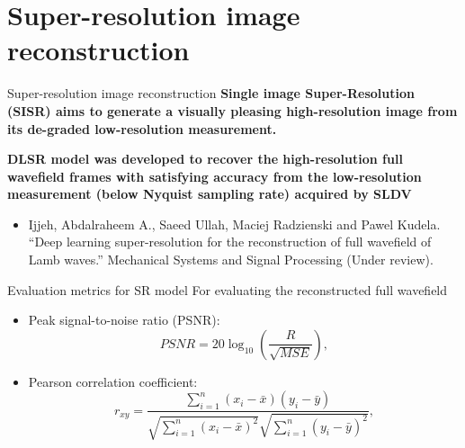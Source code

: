 \documentclass[10pt,aspectratio=169,dvipsnames]{beamer} %
\begin{document}
\section{Super-resolution image reconstruction}
\setcounter{subfigure}{0}
\begin{frame}{Super-resolution image reconstruction}
\textbf{Single image Super-Resolution (SISR) aims to generate a visually pleasing high-resolution image from its de-graded low-resolution measurement.}
\begin{figure}
	\centering
	\qquad
	\qquad
\end{figure}
\textbf{DLSR model was developed to recover the high-resolution full wavefield
	frames with satisfying accuracy from the low-resolution measurement (below Nyquist sampling rate) acquired by SLDV}
\tiny
\begin{itemize}
	\item Ijjeh, Abdalraheem A., Saeed Ullah, Maciej Radzienski and Pawel Kudela. “Deep learning super-resolution for the reconstruction of full wavefield of Lamb waves.”
	Mechanical Systems and Signal Processing (Under review).
\end{itemize}
\end{frame}

\begin{frame}{Evaluation metrics for SR model}
	For evaluating the reconstructed full wavefield
	\begin{itemize}
		\item Peak signal-to-noise ratio (PSNR):
		\begin{equation*}
			PSNR=20\log_{10}\left(\frac{R}{\sqrt{MSE}}\right),
			\label{PSNR}
		\end{equation*}
		\item Pearson correlation coefficient:
		\begin{equation*}
			r_{xy} = \frac{\sum_{i=1}^{n}(x_i - \bar{x})(y_i-\bar{y})}{\sqrt{\sum_{i=1}^{n}(x_i - \bar{x})^2}\sqrt{\sum_{i=1}^{n}(y_i - \bar{y})^2}},
			\label{Pearson}
		\end{equation*}
	\end{itemize}
\end{frame}
\end{document}
